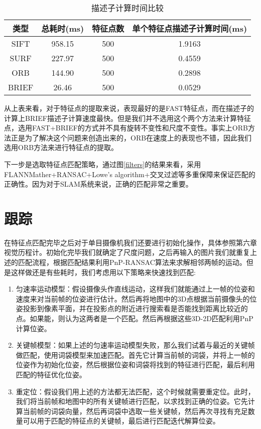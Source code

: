 \begin{table}[]
	\centering
	\caption{描述子计算时间比较}
	\begin{tabular}{cccc}
		\toprule
		类型   & 总耗时(ms) & 特征点数 & 单个特征点描述子计算时间(ms) \\ \midrule
		SIFT  & 958.15  & 500  & 1.9163           \\ \hline
		SURF  & 227.97  & 500  & 0.4559           \\ \hline
		ORB   & 144.90  & 500  & 0.2898           \\ \hline
		BRIEF & 26.46   & 500  & 0.0529          \\ \bottomrule
	\end{tabular}
\end{table}
从上表来看，对于特征点的提取来说，表现最好的是FAST特征点，而在描述子的计算上BRIEF描述子计算速度最快。但是我们并不选用这个两个方法来计算特征点，选用FAST+BRIEF的方式并不具有旋转不变性和尺度不变性。事实上ORB方法正是为了解决这个问题来创造出来的，ORB在速度上的表现也不错，因此我们选用ORB方法来进行特征点的提取。\par
下一步是选取特征点匹配策略，通过图\ref{filters}的结果来看，采用FLANNMather+RANSAC+Lowe's algorithm+交叉过滤等多重保障来保证匹配的正确性。因为对于SLAM系统来说，正确的匹配非常之重要。
\section{跟踪}
在特征点匹配完毕之后对于单目摄像机我们还要进行初始化操作，具体参照第六章视觉历程计。初始化完毕我们就确定了尺度问题，之后再输入的图片我们就重复上述的匹配流程，根据匹配结果利用PnP-RANSAC算法来求解相邻两帧的运动。但是这样做还是有些耗时，我们考虑用以下策略来快速找到匹配:
\begin{enumerate}
	\item 匀速率运动模型：假设摄像头作直线运动，这样我们就能通过上一帧的位姿和速度来对当前帧的位姿进行估计。然后再将地图中的3D点根据当前摄像头的位姿投影到像素平面，并在投影点的附近进行搜索看是否能找到距离比较近的点。如果能，则认为这两者是一个匹配。然后再根据这些3D-2D匹配利用PnP计算位姿。
	\item 关键帧模型：如果上述的匀速率运动模型失败，那么我们试着与最近的关键帧做匹配，使用词袋模型来加速匹配。首先它计算当前帧的词袋，并将上一帧的位姿作为初始化位姿，然后根据位姿和词袋将找到的特征进行匹配，最后利用匹配的特征优化位姿。
	\item 重定位：假设我们用上述的方法都无法匹配，这个时候就需要重定位。此时，我们将当前帧和地图中的所有关键帧进行匹配，以求找到正确的位姿。它先计算当前帧的词袋向量，然后再词袋中选取一些关键帧，然后再次寻找有充足数量可以用于匹配的特征点的关键帧，最后进行匹配迭代解算位姿。  
\end{enumerate}
